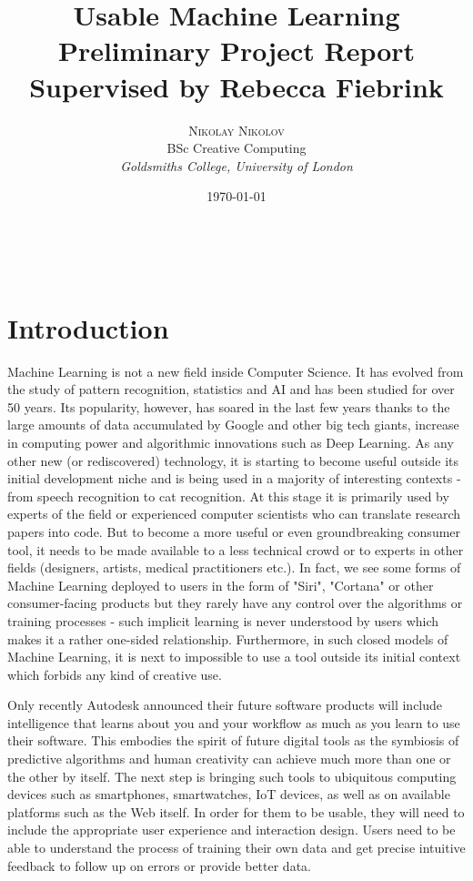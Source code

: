 \documentclass[a4paper, 11pt]{article}
\title{\textbf{Usable Machine Learning}\\ %
  Preliminary Project Report \\
  \large Supervised by Rebecca Fiebrink} %
\author{\textsc{Nikolay Nikolov} %
  \\{BSc Creative Computing} %
  \\{\textit{Goldsmiths College, University of London}}} %
\date{\today} %
\makeatletter
\renewcommand{\maketitle}{ %
    \begin{flushright} %
      {\LARGE\@title} %

      \vspace{50pt} %

      {\large\@author} %
      \\\@date %

      \vspace{40pt} %
    \end{flushright}
  }
\makeatother
\begin{document}
  \maketitle %


  \section{Introduction}
  Machine Learning is not a new field inside Computer Science. It has evolved from the study of pattern recognition, statistics and AI and has been studied for over 50 years. Its popularity, however, has soared in the last few years thanks to the large amounts of data accumulated by Google and other big tech giants, increase in computing power and algorithmic innovations such as Deep Learning. As any other new (or rediscovered) technology, it is starting to become useful outside its initial development niche and is being used in a majority of interesting contexts - from speech recognition to cat recognition. At this stage it is primarily used by experts of the field or experienced computer scientists who can translate research papers into code. But to become a more useful or even groundbreaking consumer tool, it needs to be made available to a less technical crowd or to experts in other fields (designers, artists, medical practitioners etc.). In fact, we see some forms of Machine Learning deployed to users in the form of "Siri", "Cortana" or other consumer-facing products but they rarely have any control over the algorithms or training processes - such implicit learning is never understood by users which makes it a rather one-sided relationship. Furthermore, in such closed models of Machine Learning, it is next to impossible to use a tool outside its initial context which forbids any kind of creative use.

  Only recently Autodesk announced their future software products will include intelligence that learns about you and your workflow as much as you learn to use their software. This embodies the spirit of future digital tools as the symbiosis of predictive algorithms and human creativity can achieve much more than one or the other by itself. The next step is bringing such tools to ubiquitous computing devices such as smartphones, smartwatches, IoT devices, as well as on available platforms such as the Web itself. In order for them to be usable, they will need to include the appropriate user experience and interaction design. Users need to be able to understand the process of training their own data and get precise intuitive feedback to follow up on errors or provide better data.
\end{document}

